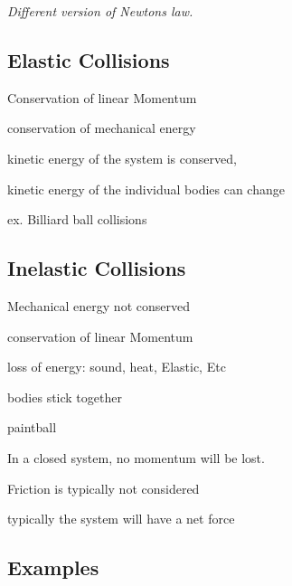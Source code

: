 \documentclass{article}
\begin{document}
    \begin{center}
        \textit{Different version of Newtons law.}
    \end{center}
    
    \begin{center}
        \large
    \end{center}

    
    \hrulefill
    \subsection{Elastic Collisions}
        \begin{list}{-}{}
            \item Conservation of linear Momentum
            \item conservation of mechanical energy
            \item kinetic energy of the system is conserved, 
            \item kinetic energy of the individual bodies can change
            \item ex. Billiard ball collisions
        \end{list}
    \subsection{Inelastic Collisions}
        \begin{list}{-}{}
            \item Mechanical energy not conserved 
            \item conservation of linear Momentum
            \item loss of energy: sound, heat, Elastic, Etc 
            \item bodies stick together 
            \item paintball
        \end{list}

    In a closed system, no momentum will be  lost. 

    \begin{list}{-}{}
        \item Friction is typically not considered 
        \item typically the system will have a net force
    \end{list}
    \pagebreak

\subsection{\huge \centering Examples}
\hrulefill
\centering
\end{document}
